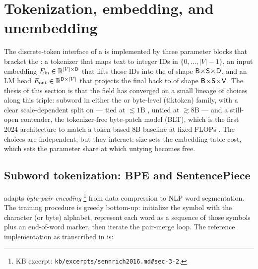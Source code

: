 
\section{Tokenization, embedding, and unembedding}
\label{sec:tokenization-embedding}

The discrete-token interface of a   is implemented by three
parameter blocks that bracket the : a tokenizer that maps
text to integer IDs in $\{0, \dots, |V|-1\}$, an input embedding
$E_{\text{in}} \in \mathbb{R}^{|V| \times \mathsf{D}}$ that lifts those IDs into
the  of shape $\mathsf{B}\!\times\!\mathsf{S}\!\times\!\mathsf{D}$, and an LM head
$E_{\text{out}} \in \mathbb{R}^{\mathsf{D} \times |V|}$ that projects the final
 back to  of shape $\mathsf{B}\!\times\!\mathsf{S}\!\times\!\mathsf{V}$. The thesis of this
section is that the field has converged on a small lineage of choices
along this triple: subword  in either the  or
byte-level (tiktoken) family, with a clear scale-dependent split on
 — tied at $\lesssim 1$B , untied at $\gtrsim 8$B —
and a still-open contender, the tokenizer-free byte-patch model (BLT),
which is the first 2024 architecture to match a token-based 8B baseline
at fixed FLOPs \citep{blt2024}. The choices are independent, but they
interact:  size sets the embedding-table cost, which sets the
parameter share at which untying becomes free.

\subsection{Subword tokenization: BPE and SentencePiece}
\label{sec:tok-bpe}

\citet{sennrich2016} adapts \emph{byte-pair encoding} \citep[Gage
1994;][\S 3.2]{sennrich2016}\footnote{KB excerpt:
\texttt{kb/excerpts/sennrich2016.md\#sec-3-2}.} from data compression
to NLP word segmentation. The training procedure is greedy bottom-up:
initialize the symbol  with the character (or byte) alphabet,
represent each word as a sequence of those symbols plus an
end-of-word marker, then iterate the pair-merge loop. The reference
implementation as transcribed in \citet[\S 3.2, Algorithm 1]{sennrich2016}
is:

